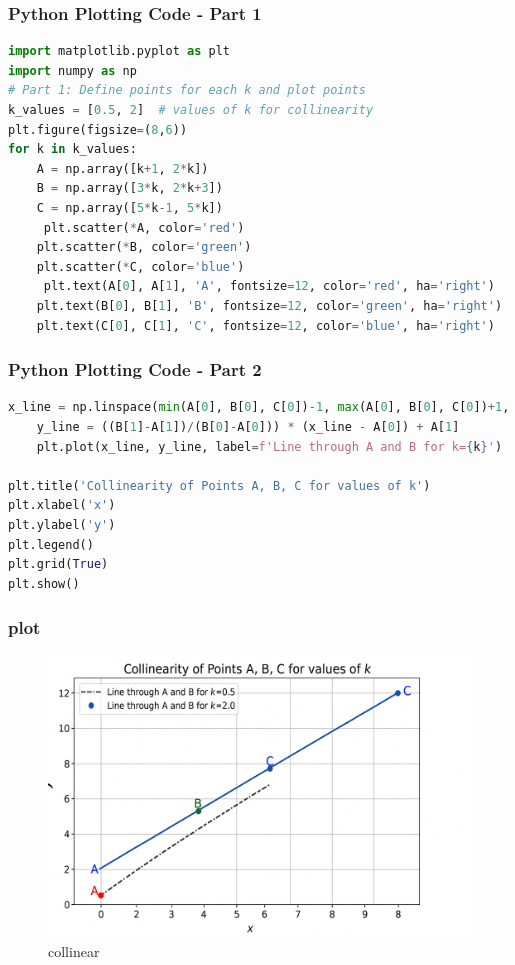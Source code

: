 \documentclass{beamer}
\begin{document}
\begin{frame}[fragile]

\frametitle{\textbf{Python Plotting Code - Part 1}}
\begin{lstlisting}[language=Python]
import matplotlib.pyplot as plt
import numpy as np
# Part 1: Define points for each k and plot points
k_values = [0.5, 2]  # values of k for collinearity
plt.figure(figsize=(8,6))
for k in k_values:
    A = np.array([k+1, 2*k])
    B = np.array([3*k, 2*k+3])
    C = np.array([5*k-1, 5*k])
     plt.scatter(*A, color='red')
    plt.scatter(*B, color='green')
    plt.scatter(*C, color='blue')
     plt.text(A[0], A[1], 'A', fontsize=12, color='red', ha='right')
    plt.text(B[0], B[1], 'B', fontsize=12, color='green', ha='right')
    plt.text(C[0], C[1], 'C', fontsize=12, color='blue', ha='right')
\end{lstlisting}
\end{frame}
\begin{frame}[fragile]

\frametitle{\textbf{Python Plotting Code - Part 2}}
\begin{lstlisting}[language=Python]
    x_line = np.linspace(min(A[0], B[0], C[0])-1, max(A[0], B[0], C[0])+1, 100)
    y_line = ((B[1]-A[1])/(B[0]-A[0])) * (x_line - A[0]) + A[1]
    plt.plot(x_line, y_line, label=f'Line through A and B for k={k}')

plt.title('Collinearity of Points A, B, C for values of k')
plt.xlabel('x')
plt.ylabel('y')
plt.legend()
plt.grid(True)
plt.show()


\end{lstlisting}
\end{frame}
\begin{frame}[fragile]
\frametitle{plot}

\begin{figure}
    \centering
    \includegraphics[width=0.5\linewidth]{figs/plot.png}
    \caption{collinear}
    \label{fig:placeholder}
\end{figure}



\end{frame}
\end{document}
